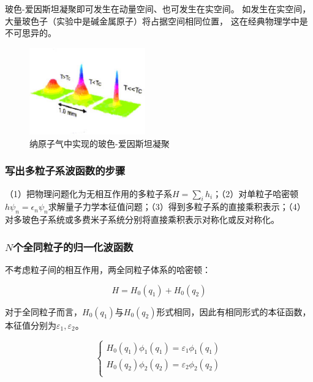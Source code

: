 玻色-爱因斯坦凝聚即可发生在动量空间、也可发生在实空间。
如发生在实空间，大量玻色子（实验中是碱金属原子）将占据空间相同位置，
这在经典物理学中是不可思异的。



\begin{figure}[h]
\begin{center}
\includegraphics[clip,width=5cm]{IdenticalParticles/31-2.ps}
\caption{纳原子气中实现的玻色-爱因斯坦凝聚}
\end{center}
\end{figure}


\subsubsection{写出多粒子系波函数的步骤}

（1）把物理问题化为无相互作用的多粒子系$H = \sum\limits_{i}{h_i}
$；（2）对单粒子哈密顿$h \psi_n = \epsilon_n
\psi_n$求解量子力学本征值问题；（3）得到多粒子系的直接乘积表示；（4）对多玻色子系统或多费米子系统分别将直接乘积表示对称化或反对称化。



\subsubsection{$N$个全同粒子的归一化波函数}

不考虑粒子间的相互作用，两全同粒子体系的哈密顿：

\begin{equation}\label{31-6}
H = H_0 \left( {q_1 } \right) + H_0 \left( {q_2 } \right)
\end{equation}


对于全同粒子而言，$H_0 \left( {q_1 } \right)$与$H_0 \left( {q_2 }
\right)$形式相同，因此有相同形式的本征函数，本征值分别为$\varepsilon
_1 ,\varepsilon _2 $。


\begin{equation}\label{31-7}
\left\{ \begin{array}{l}
 H_0 \left( {q_1 } \right)\phi _1 \left( {q_1 } \right) = \varepsilon _1 \phi _1 \left( {q_1 } \right) \\
 H_0 \left( {q_2 } \right)\phi _2 \left( {q_2 } \right) = \varepsilon _2 \phi _2 \left( {q_2 } \right) \\
 \end{array} \right.
\end{equation}


